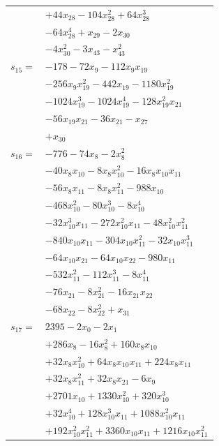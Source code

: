 \begin{longtable}{@{}r@{\;}l@{}}
 & \(\displaystyle +44x_{28} -104x_{28}^{2} +64x_{28}^{3}\) \\
 & \(\displaystyle -64x_{28}^{4} +x_{29} -2x_{30}\) \\
 & \(\displaystyle -4x_{30}^{2} -3x_{43} -x_{43}^{2}\) \\[3pt]
\(s_{15}=\) & \(\displaystyle -178 -72x_{9} -112x_{9}x_{19}\) \\
 & \(\displaystyle -256x_{9}x_{19}^{2} -442x_{19} -1180x_{19}^{2}\) \\
 & \(\displaystyle -1024x_{19}^{3} -1024x_{19}^{4} -128x_{19}^{2}x_{21}\) \\
 & \(\displaystyle -56x_{19}x_{21} -36x_{21} -x_{27}\) \\
 & \(\displaystyle +x_{30}\) \\[3pt]
\(s_{16}=\) & \(\displaystyle -776 -74x_{8} -2x_{8}^{2}\) \\
 & \(\displaystyle -40x_{8}x_{10} -8x_{8}x_{10}^{2} -16x_{8}x_{10}x_{11}\) \\
 & \(\displaystyle -56x_{8}x_{11} -8x_{8}x_{11}^{2} -988x_{10}\) \\
 & \(\displaystyle -468x_{10}^{2} -80x_{10}^{3} -8x_{10}^{4}\) \\
 & \(\displaystyle -32x_{10}^{3}x_{11} -272x_{10}^{2}x_{11} -48x_{10}^{2}x_{11}^{2}\) \\
 & \(\displaystyle -840x_{10}x_{11} -304x_{10}x_{11}^{2} -32x_{10}x_{11}^{3}\) \\
 & \(\displaystyle -64x_{10}x_{21} -64x_{10}x_{22} -980x_{11}\) \\
 & \(\displaystyle -532x_{11}^{2} -112x_{11}^{3} -8x_{11}^{4}\) \\
 & \(\displaystyle -76x_{21} -8x_{21}^{2} -16x_{21}x_{22}\) \\
 & \(\displaystyle -68x_{22} -8x_{22}^{2} +x_{31}\) \\[3pt]
\(s_{17}=\) & \(\displaystyle 2395 -2x_{0} -2x_{1}\) \\
 & \(\displaystyle +286x_{8} -16x_{8}^{2} +160x_{8}x_{10}\) \\
 & \(\displaystyle +32x_{8}x_{10}^{2} +64x_{8}x_{10}x_{11} +224x_{8}x_{11}\) \\
 & \(\displaystyle +32x_{8}x_{11}^{2} +32x_{8}x_{21} -6x_{9}\) \\
 & \(\displaystyle +2701x_{10} +1330x_{10}^{2} +320x_{10}^{3}\) \\
 & \(\displaystyle +32x_{10}^{4} +128x_{10}^{3}x_{11} +1088x_{10}^{2}x_{11}\) \\
 & \(\displaystyle +192x_{10}^{2}x_{11}^{2} +3360x_{10}x_{11} +1216x_{10}x_{11}^{2}\) \\

\end{longtable}
